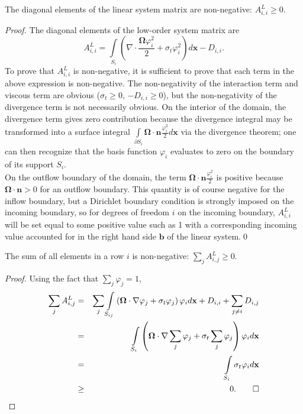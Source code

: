 \begin{lemma}\label{diagonalpositive}
   The diagonal elements  of the linear system matrix are non-negative: $A^L_{i,i}\ge 0$.
\end{lemma}
\begin{proof}
The diagonal elements  of the low-order system matrix are
\[
	A^L_{i,i} = \int\limits_{S_{i}}\left(\nabla\cdot\frac{\mathbf{\Omega}\varphi_i^2}{2} +
		\sigma_t\varphi_i^2\right) d\mathbf{x} - D_{i,i}.
\]
To prove that $A^L_{i,i}$ is non-negative, it is sufficient to prove that
each term in the above expression is non-negative. The non-negativity of
the interaction term and viscous term are obvious ($\sigma_t \ge 0$, $-D_{i,i}\geq 0$), but
the non-negativity of the divergence term is not necessarily obvious. On the interior of
the domain, the divergence term gives zero contribution because the divergence integral may
be transformed into a surface integral $\int\limits_{\partial S_{i}}
\mathbf{\Omega}\cdot\mathbf{n}\frac{\varphi_i^2}{2} d\mathbf{x}$
via the divergence theorem; one can then recognize that
the basis function $\varphi_i$ evaluates to zero on the boundary of its support $S_{i}$.\\
On the outflow boundary of the domain, the term $\mathbf{\Omega}\cdot\mathbf{n}
\frac{\varphi_i^2}{2}$ is positive because $\mathbf{\Omega}\cdot\mathbf{n} >0$
for an outflow boundary. This quantity is of course negative for the inflow boundary,
but a Dirichlet boundary condition is strongly imposed on the incoming boundary, so
for degrees of freedom $i$ on the incoming boundary, $A^L_{i,i}$ will be set equal
to some positive value such as 1 with a corresponding incoming value
accounted for in the right hand side $\mathbf{b}$ of the linear system.\qed
\end{proof}

\newpage
\begin{lemma}
   The sum of all elements in a row $i$ is non-negative: $\sum\limits_j A^L_{i,j} \ge 0$.
\end{lemma}

\begin{proof}
Using the fact that $\sum\limits_j\varphi_j=1$,
\begin{eqnarray*}
	\sum\limits_j A^L_{i,j} & = & \sum\limits_j\int\limits_{S_{ij}}
      \left(\mathbf{\Omega}\cdot\nabla\varphi_j +
		\sigma_t\varphi_j\right)\varphi_i d\mathbf{x} +
		D_{i,i} + \sum\limits_{j\neq i}D_{i,j}\\
		& = & \int\limits_{S_{i}}\left(\mathbf{\Omega}\cdot\nabla\sum\limits_j\varphi_j +
		\sigma_t\sum\limits_j\varphi_j\right)\varphi_i d\mathbf{x}\\
		& = & \int\limits_{S_{i}}\sigma_t\varphi_i d\mathbf{x}\\
		&\ge& 0.\qed
\end{eqnarray*}
\end{proof}

